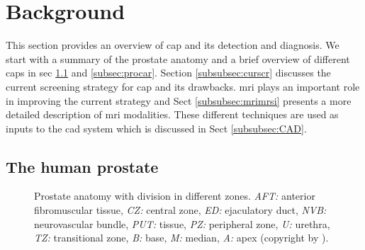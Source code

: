\section{Background} \label{sec:background}

This section provides an overview of \ac{cap} and its detection and diagnosis. We start with a summary of the prostate anatomy and a brief overview of different \acp{cap} in \acs{sec} \ref{subsec:humpro} and \ref{subsec:procar}. Section \ref{subsubsec:curscr} discusses the current screening strategy for \ac{cap} and its drawbacks. \ac{mri} plays an important role in improving the current strategy and Sect \ref{subsubsec:mrimrsi} presents a more detailed description of \ac{mri} modalities. These different techniques are used as inputs to the \acs{cad} system which is discussed in Sect \ref{subsubsec:CAD}.

\subsection{The human prostate}\label{subsec:humpro}

\begin{figure}
	\centering
	\hspace*{\fill}
			\hfill
	\hspace*{\fill}
	\caption{Prostate anatomy with division in different zones. \textit{AFT:} anterior fibromuscular tissue, \textit{CZ:} central zone, \textit{ED:} ejaculatory duct, \textit{NVB:} neurovascular bundle, \textit{PUT:}  tissue, \textit{PZ:} peripheral zone, \textit{U:} urethra, \textit{TZ:} transitional zone, \textit{B:} base, \textit{M:} median, \textit{A:} apex (copyright by \cite{Choi2007}).}
	\label{fig:anatomyProstateZone}
\end{figure}

